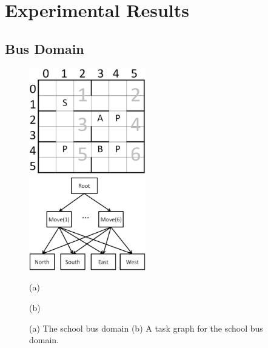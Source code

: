 \chapter{Experimental Results}

\section{Bus Domain}
\begin{figure}[t]
 \begin{minipage}[b]{0.5\linewidth}
    \begin{center}
    \includegraphics[width=2.0in] {./figures/BusSmall.eps}
\end{center}
\end{minipage}
\begin{minipage}[b]{0.5\linewidth}
    \begin{center}
    \includegraphics[width=2.0in] {./figures/BusHierarchy.eps}
\end{center}
\end{minipage}
\begin{minipage}[b]{0.5\linewidth} \centering (a) \end{minipage}
\begin{minipage}[b]{0.5\linewidth} \centering (b) \end{minipage}

\caption{(a) The school bus domain (b) A task graph for the school bus domain.}
\label{fig:bus}
\end{figure}

